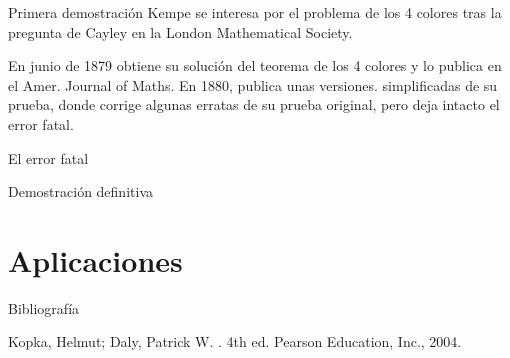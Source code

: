 \documentclass[spanish,utf8]{beamer}
\begin{document}
\begin{frame}{\insertsection}\transblindsvertical
\begin{block}{Primera demostración}
Kempe se interesa por el problema de los 4 colores tras la pregunta de Cayley en la London Mathematical Society.
\end{block}

\begin{block}{}
En junio de 1879 obtiene su solución del teorema de los 4 colores y lo publica en el Amer. Journal of Maths. En 1880, publica unas versiones. simplificadas de su prueba, donde corrige algunas erratas de su prueba original, pero deja intacto el error fatal.
\end{block}
    \end{frame}

\begin{frame}{\insertsection}\transblindsvertical
El error fatal
\end{frame}

\begin{frame}{\insertsection}\transblindsvertical
Demostración definitiva
\end{frame}

\section{Aplicaciones}
\begin{frame}{\insertsection}\transblindsvertical

\end{frame}

\begin{frame}{Bibliografía}\transblindsvertical
\begin{thebibliography}{9}
	Kopka, Helmut; Daly, Patrick W.
	. 4th ed.
	\newblock Pearson Education, Inc., 2004.
\end{thebibliography}
\end{frame}
\end{document}
